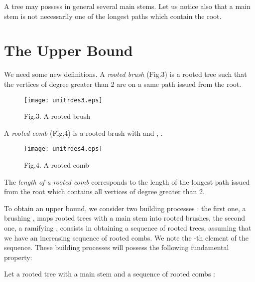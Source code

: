 \documentclass{llncs}
\begin{document}
\begin{remark} A tree may possess in general several main stems. Let
us notice also that a main stem is not necessarily one of the
longest paths which contain the root.
\end{remark}




\section{The Upper Bound}





We need some new definitions. A \textit{rooted brush} (Fig.3) is a
rooted tree such that the vertices of degree greater than 2 are on
a same path  issued from the root.

\begin{figure}[htbp]
\centerline{\texttt{[image: unitrdes3.eps]}}
\label{fig3}
\begin{center}
Fig.3. A rooted brush
\end{center}
\end{figure}

A \textit{rooted comb}  (Fig.4) is a rooted brush with  and , .

\begin{figure}[htbp]
\centerline{\texttt{[image: unitrdes4.eps]}}
\label{fig4}
\begin{center}
Fig.4. A rooted comb
\end{center}
\end{figure}



The \textit{length of a rooted comb} corresponds to the length of the longest path  issued from the root
which contains all vertices of degree greater than 2.





To obtain an upper bound, we consider two building processes : the
first one, a brushing , maps rooted trees with a main stem
into rooted brushes, the second one, a ramifying , consists
in obtaining a sequence of rooted trees, assuming that we have an
increasing sequence of rooted combs. We note  the -th
element of the sequence. These building processes will possess the
following fundamental property:





\begin{property} \label{pr1} Let  a rooted tree with a
main stem  and  a sequence of rooted combs :



\end{property}
\end{document}
